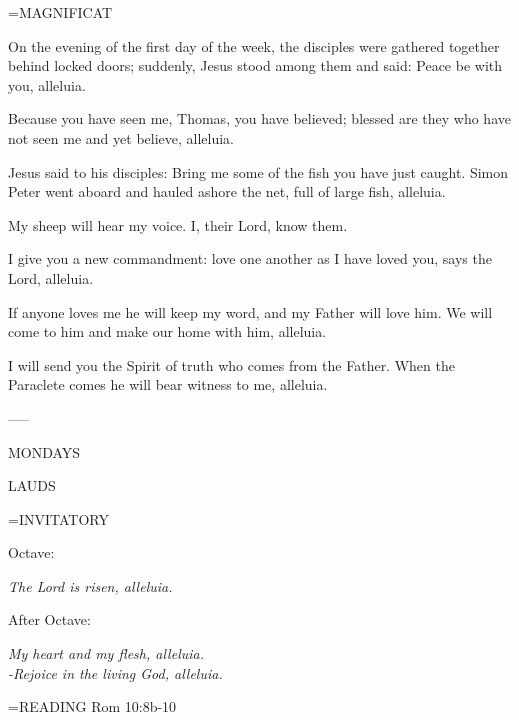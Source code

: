 \hangindent=\parindent \small MAGNIFICAT
\begin{description}[labelindent=\parindent, noitemsep, leftmargin=*]
\item [Easter Sunday:] 	On the evening of the first day of the week, the disciples were gathered together behind locked doors; suddenly, Jesus stood among them and said: Peace be with you, alleluia.
\item [Divine Mercy Sunday:] 	Because you have seen me, Thomas, you have believed; blessed are they who have not seen me and yet believe, alleluia.
\item [3rd Sunday:] 		Jesus said to his disciples: Bring me some of the fish you have just caught. Simon Peter went aboard and hauled ashore the net, full of large fish, alleluia.
\item [4th Sunday:] 		My sheep will hear my voice. I, their Lord, know them.
\item [5th Sunday:] 		I give you a new commandment: love one another as I have loved you, says the Lord, alleluia.
\item [6th Sunday:] 		If anyone loves me he will keep my word, and my Father will love him. We will come to him and make our home with him, alleluia.
\item [7th Sunday:] 		I will send you the Spirit of truth who comes from the Father. When the Paraclete comes he will bear witness to me, alleluia.
\end{description}

-----
\begin{center}
\normalsize MONDAYS
\end{center}

\begin{flushleft}\normalsize LAUDS\\\end{flushleft}
\hangindent=\parindent \small{INVITATORY}
\begin{center}
\end{center}Octave:\begin{center}\textit{	The Lord is risen, alleluia.\\}
\end{center}After Octave:\begin{center}\textit{	My heart and my flesh, alleluia.\\}
\textit{		-Rejoice in the living God, alleluia.\\}
\end{center}

\hangindent=\parindent \small{READING}    Rom 10:8b-10 \textbf{   \\}

